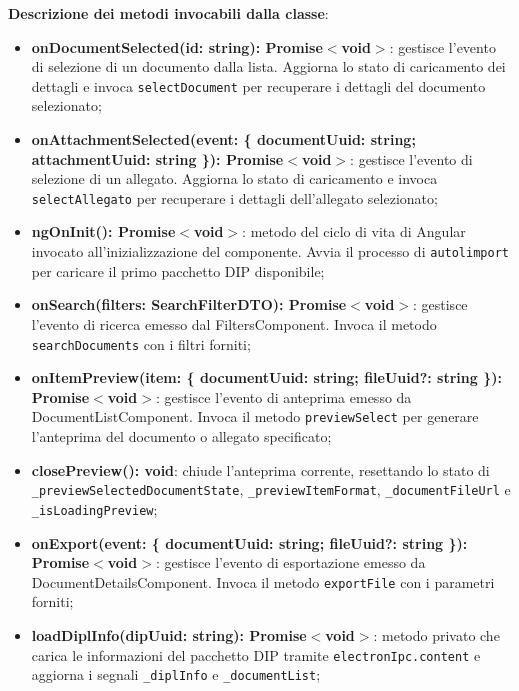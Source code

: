 \documentclass[a4paper,12pt]{article}
\begin{document}
{{{{                \noindent \textbf{Descrizione dei metodi invocabili dalla classe}:
                \begin{itemize}
                    \item \textbf{onDocumentSelected(id: string): Promise$<$void$>$}: gestisce l'evento di selezione di un documento dalla lista. Aggiorna lo stato di caricamento dei dettagli e invoca \texttt{selectDocument} per recuperare i dettagli del documento selezionato;
                    \item \textbf{onAttachmentSelected(event: \{ documentUuid: string; attachmentUuid: string \}): Promise$<$void$>$}: gestisce l'evento di selezione di un allegato. Aggiorna lo stato di caricamento e invoca \texttt{selectAllegato} per recuperare i dettagli dell'allegato selezionato;
                    \item \textbf{ngOnInit(): Promise$<$void$>$}: metodo del ciclo di vita di Angular invocato all'inizializzazione del componente. Avvia il processo di \texttt{autolimport} per caricare il primo pacchetto DIP disponibile;
                    \item \textbf{onSearch(filters: SearchFilterDTO): Promise$<$void$>$}: gestisce l'evento di ricerca emesso dal FiltersComponent. Invoca il metodo \texttt{searchDocuments} con i filtri forniti;
                    \item \textbf{onItemPreview(item: \{ documentUuid: string; fileUuid?: string \}): Promise$<$void$>$}: gestisce l'evento di anteprima emesso da DocumentListComponent. Invoca il metodo \texttt{previewSelect} per generare l'anteprima del documento o allegato specificato;
                    \item \textbf{closePreview(): void}: chiude l'anteprima corrente, resettando lo stato di \\ \texttt{\_previewSelectedDocumentState}, \texttt{\_previewItemFormat}, \texttt{\_documentFileUrl} e \\ \texttt{\_isLoadingPreview};
                    \item \textbf{onExport(event: \{ documentUuid: string; fileUuid?: string \}): Promise$<$void$>$}: gestisce l'evento di esportazione emesso da DocumentDetailsComponent. Invoca il metodo \texttt{exportFile} con i parametri forniti;
                    \item \textbf{loadDiplInfo(dipUuid: string): Promise$<$void$>$}: metodo privato che carica le informazioni del pacchetto DIP tramite \texttt{electronIpc.content} e aggiorna i segnali \texttt{\_diplInfo} e \texttt{\_documentList};

\end{itemize}}}}}
\end{document}
